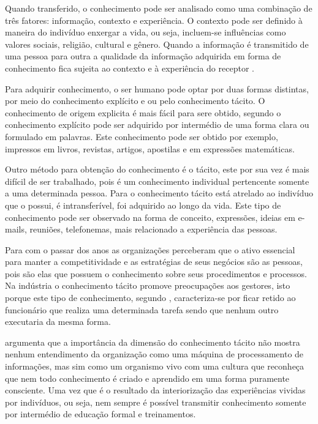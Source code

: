 Quando transferido, o conhecimento pode ser analisado como uma combinação de três fatores: informação, contexto e experiência. O contexto pode ser definido à maneira do indivíduo enxergar a vida, ou seja, incluem-se influências como valores sociais, religião, cultural e gênero. Quando a informação é transmitido de uma pessoa para outra a qualidade da informação adquirida em forma de conhecimento fica sujeita ao contexto e à experiência do receptor \cite{SAJLIS1449}.

Para adquirir conhecimento, o ser humano pode optar por duas formas distintas, por meio do conhecimento explícito e ou pelo conhecimento tácito. O conhecimento de origem explicita é mais fácil para sere obtido, segundo  o conhecimento explícito pode ser adquirido por intermédio de uma forma clara ou formulado em palavras. Este conhecimento pode ser obtido por exemplo, impressos em livros, revistas, artigos, apostilas e em expressões matemáticas.

Outro método para obtenção do conhecimento é o tácito, este por sua vez é mais difícil de ser trabalhado, pois é um conhecimento individual pertencente somente a uma determinada pessoa. Para  o conhecimento tácito está atrelado ao indivíduo que o possui, é intransferível, foi adquirido ao longo da vida. Este tipo de conhecimento pode ser observado na forma de conceito, expressões, ideias em e-mails, reuniões, telefonemas, mais relacionado a experiência das pessoas.

Para  com o passar dos anos as organizações perceberam que o ativo essencial para manter a competitividade e as estratégias de seus negócios são as pessoas, pois são elas que possuem o conhecimento sobre seus procedimentos e processos. Na indústria o conhecimento tácito promove preocupações aos gestores, isto porque este tipo de conhecimento, segundo , caracteriza-se por ficar retido ao funcionário que realiza uma determinada tarefa sendo que nenhum outro executaria da mesma forma.

 argumenta que a importância da dimensão do conhecimento tácito não mostra nenhum entendimento da organização como uma máquina de processamento de informações, mas sim como um organismo vivo com uma cultura que reconheça que nem todo conhecimento é criado e aprendido em uma forma puramente consciente. Uma vez que é o resultado da interiorização das experiências vividas por indivíduos, ou seja, nem sempre é possível transmitir conhecimento somente por intermédio de educação formal e treinamentos.

